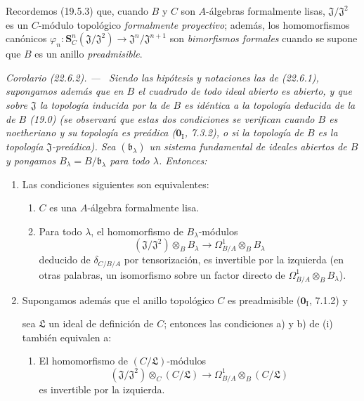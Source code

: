 \documentclass[10pt,oneside]{book}
\makeatletter
\newcommand{\setmanualcurrentlabel}[1]{\def\@currentlabel{#1}}
\newcommand{\oldpage}[2][]{%
  \setcounter{footnote}{0}%
  \marginpar{\scriptsize\textbf{#1}~|~#2}\ignorespaces}
\newenvironment{corollary}[1][]{%
  \setmanualcurrentlabel{#1}\par\medskip\noindent\itshape Corolario (#1). ---\ }{\par}
\makeatother
\begin{document}
Recordemos (19.5.3) que, cuando $B$ y $C$ son $A$-álgebras formalmente
lisas, $\mathfrak J/\mathfrak J^2$ es un $C$-módulo topológico
\emph{formalmente proyectivo}; además, los homomorfismos canónicos
$\varphi_n:\mathbf S_C^n(\mathfrak J/\mathfrak J^2)
\longrightarrow\mathfrak J^n/\mathfrak J^{n+1}$ son
\emph{bimorfismos formales} cuando se supone que $B$ es un anillo
\emph{preadmisible}.
\begin{corollary}[22.6.2]
\label{0.22.6.2-es}
Siendo las hipótesis y notaciones las de \textup{(22.6.1)}, supongamos además que
en $B$ el cuadrado de todo ideal abierto es abierto, y que sobre $\mathfrak J$ la
topología inducida por la de $B$ es idéntica a la topología deducida de
la de $B$ \textup{(19.0)} \textup{(se observará que estas dos condiciones se verifican cuando
$B$ es \emph{noetheriano} y su topología es \emph{preádica} ($\mathbf 0_{\mathrm I}$, 7.3.2), o si la
topología de $B$ es la topología $\mathfrak J$-\emph{preádica})}. Sea
$(\mathfrak b_\lambda)$ un sistema fundamental de ideales abiertos de $B$ y
pongamos $B_\lambda=B/\mathfrak b_\lambda$ para todo $\lambda$. Entonces:
\begin{enumerate}
  \item[\rm(i)] Las condiciones siguientes son equivalentes:
  \begin{enumerate}
    \item[\textup{a)}] $C$ es una $A$-álgebra formalmente lisa.
    \item[\textup{b)}] Para todo $\lambda$, el homomorfismo de $B_\lambda$-módulos
    \begin{equation}
    \label{0.22.6.2.1-es}
      (\mathfrak J/\mathfrak J^2)\otimes_BB_\lambda
      \longrightarrow\Omega^1_{B/A}\otimes_BB_\lambda
      \tag{22.6.2.1}
    \end{equation}
    deducido de $\delta_{C/B/A}$ por tensorización, es invertible por la izquierda
    \textup{(en otras palabras, un isomorfismo sobre un factor directo de
    $\Omega^1_{B/A}\otimes_BB_\lambda$)}.
  \end{enumerate}
  \item[\rm(ii)] Supongamos además que el anillo topológico $C$ es
  preadmisible \textup{($\mathbf 0_{\mathrm I}$, 7.1.2)} y

  \oldpage[0\textsubscript{IV-1}]{206}

  sea $\mathfrak L$ un ideal de definición de $C$; entonces las condiciones \textup{a)}
  y \textup{b)} de \textup{(i)} también equivalen a:
  \begin{enumerate}
    \item[\textup{c)}] El homomorfismo de $(C/\mathfrak L)$-módulos
    \[
      (\mathfrak J/\mathfrak J^2)\otimes_C(C/\mathfrak L)
      \longrightarrow\Omega^1_{B/A}\otimes_B(C/\mathfrak L)
    \]
    es invertible por la izquierda.
  \end{enumerate}
\end{enumerate}
\end{corollary}
\end{document}
